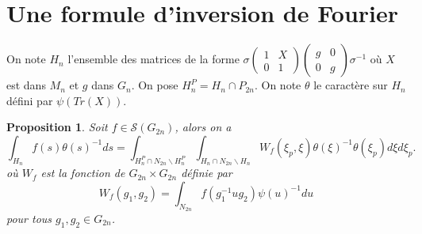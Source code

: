 \documentclass{amsart}
\newtheorem{proposition}{Proposition}[section]
\begin{document}
\section{Une formule d'inversion de Fourier}

On note $H_n$ l'ensemble des matrices de la forme $\sigma \begin{pmatrix}
1 & X \\
0 & 1
\end{pmatrix}\begin{pmatrix}
g & 0 \\
0 & g
\end{pmatrix} \sigma^{-1}$ où $X$ est dans $M_n$ et $g$ dans $G_n$. On pose $H^P_n = H_n \cap P_{2n}$. On note $\theta$ le caractère sur $H_n$ défini par $\psi(Tr(X))$.

\begin{proposition}
\label{unfolding}
Soit $f \in \mathcal{S}(G_{2n})$, alors on a
\begin{equation}
\int_{H_n} f(s) \theta(s)^{-1} ds = \int_{H^P_n \cap N_{2n} \backslash{H^P_n}} \int_{H_n \cap N_{2n} \backslash{H_n}} W_f(\xi_p, \xi) \theta(\xi)^{-1} \theta(\xi_p) d\xi d\xi_p .
\end{equation}
où $W_f$ est la fonction de $G_{2n} \times G_{2n}$ définie par
\begin{equation}
W_f(g_1,g_2) = \int_{N_{2n}} f(g_1^{-1}ug_2) \psi(u)^{-1} du
\end{equation}
pour tous $g_1, g_2 \in G_{2n}$.
\end{proposition}
\end{document}
